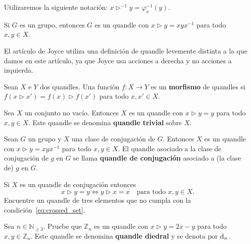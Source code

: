 \documentclass[graybox]{svmult}
\newcommand{\N}{\mathbb{N}}
\newcommand{\Z}{\mathbb{Z}}
\begin{document}
	Utilizaremos la siguiente notación: $x\triangleright^{-1}
	y=\varphi_x^{-1}(y)$. 

\begin{example}
    Si $G$ es un grupo, entonces $G$ es un quandle con $x\triangleright y=xyx^{-1}$ para todo $x,y\in X$.  
\end{example}

	El artículo de Joyce utiliza una definición de quandle levemente distinta a
	la que damos en este artículo, ya que Joyce usa acciones a derecha y no
	acciones a izquierda. 

	\begin{definition}
		Sean $X$ e $Y$ dos quandles. Una función $f\colon X\to Y$ es un
		\textbf{morfismo} de quandles si $f(x\triangleright x')=f(x)\triangleright
		f(x')$ para todo $x,x'\in X$.
	\end{definition}

\begin{example}
     Sea $X$ un conjunto no vacío. Entonces $X$ es un
    quandle con $x\triangleright y=y$ para todo $x,y\in X$. Este quandle se
    denomina \textbf{quandle trivial} sobre $X$.
\end{example}

\begin{example}
    Sean $G$ un grupo y $X$ una clase de conjugación de $G$. Entonces $X$ es un
    quandle con $x\triangleright y=xyx^{-1}$ para todo $x,y\in X$.  El quandle
    asociado a la clase de conjugación de $g$ en $G$ se llama \textbf{quandle
	de conjugación} asociado a (la clase de) $g$ en $G$.
\end{example}

\begin{exercise}
    Si $X$ es un quandle de conjugación entonces 
    \begin{equation}
        \label{eq:crossed_set}
        x\triangleright y=y\Longleftrightarrow y\triangleright x=x\quad\text{para todo $x,y\in X$}.
    \end{equation}
    Encuentre un quandle de tres elementos que no cumpla con la
    condición~\eqref{eq:crossed_set}. 
\end{exercise}

\begin{exercise}
	Sea $n\in\N_{\geq3}$. Pruebe que $\Z_n$ es un quandle con 
    $x\triangleright y=2x-y$ para todo $x,y\in\Z_n$. Este quandle se denomina
    \textbf{quandle diedral} y se denota por $\mathrm{d}_n$. 
\end{exercise}
\end{document}
